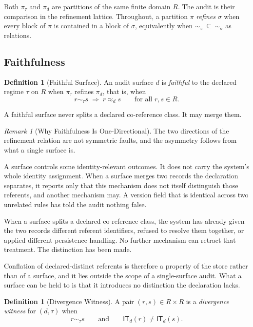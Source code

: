 \documentclass[11pt]{article}
\theoremstyle{plain}
\theoremstyle{definition}
\newtheorem{definition}[theorem]{Definition}
\theoremstyle{remark}
\newtheorem{remark}[theorem]{Remark}
\newcommand{\IT}{\ensuremath{\mathsf{IT}}}
\newcommand{\Ker}{\ensuremath{\mathrel{\approx_{d}}}}
\begin{document}
Both \(\pi_{\tau}\) and \(\pi_d\) are partitions of the same finite domain \(R\).
The audit is their comparison in the refinement lattice.
Throughout, a partition \(\pi\) \emph{refines} \(\sigma\)
when every block of \(\pi\) is contained in a block of \(\sigma\),
equivalently when \(\sim_{\pi}\,\subseteq\,\sim_{\sigma}\) as relations.

\subsection{Faithfulness}

\begin{definition}[Faithful Surface]
  \label{oi.def.faithful}
  An audit surface \(d\) is \emph{faithful} to the declared regime \(\tau\) on \(R\)
  when \(\pi_{\tau}\) refines \(\pi_d\), that is, when
  \[
    r\sim_{\tau}s
    \;\Longrightarrow\;
    r\Ker s
    \qquad\text{for all }r,s\in R.
  \]
\end{definition}

A faithful surface never splits a declared co-reference class.
It may merge them.

\begin{remark}[Why Faithfulness Is One-Directional]
  \label{oi.rem.asymmetry}
  The two directions of the refinement relation are not symmetric faults,
  and the asymmetry follows from what a single surface is.

  A surface controls some identity-relevant outcomes.
  It does not carry the system's whole identity assignment.
  When a surface merges two records the declaration separates,
  it reports only that this mechanism does not itself
  distinguish those referents,
  and another mechanism may.
  A version field that is identical across two unrelated rules
  has told the audit nothing false.

  When a surface splits a declared co-reference class,
  the system has already given the two records
  different referent identifiers,
  refused to resolve them together,
  or applied different persistence handling.
  No further mechanism can retract that treatment.
  The distinction has been made.

  Conflation of declared-distinct referents is therefore
  a property of the store rather than of a surface,
  and it lies outside the scope of a single-surface audit.
  What a surface can be held to
  is that it introduces no distinction the declaration lacks.
\end{remark}

\begin{definition}[Divergence Witness]
  \label{oi.def.divergence}
  A pair \((r,s)\in R\times R\)
  is a \emph{divergence witness} for \((d,\tau)\) when
  \[
    r\sim_{\tau}s
    \qquad\text{and}\qquad
    \IT_d(r)\neq\IT_d(s).
  \]
\end{definition}
\end{document}
